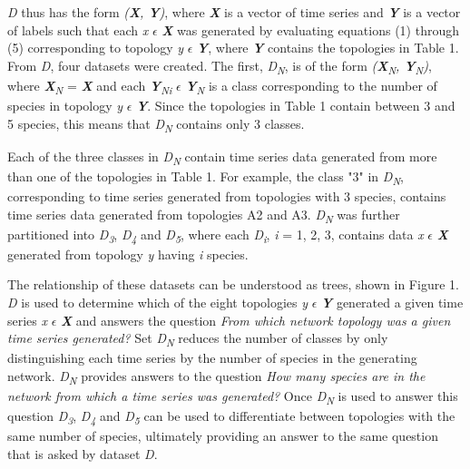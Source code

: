 \documentclass[letterpaper, 10 pt, conference]{ieeeconf}  %
\begin{document}
\textit{D} thus has the form \textit{(\textbf{X}, \textbf{Y})}, where \textit{\textbf{X}} is a vector of time series and \textit{\textbf{Y}} is a vector of labels such that each \textit{x} $\epsilon$ \textit{\textbf{X}} was generated by evaluating equations (1) through (5) corresponding to topology \textit{y} $\epsilon$ \textit{\textbf{Y}}, where \textit{\textbf{Y}} contains the topologies in Table 1. From \textit{D}, four datasets were created. The first, \textit{D\textsubscript{N}}, is of the form \textit{(\textbf{X}\textsubscript{N}, \textbf{Y}\textsubscript{N})}, where \textit{\textbf{X}\textsubscript{N}} = \textit{\textbf{X}} and each \textit{\textbf{Y}\textsubscript{Ni}} $\epsilon$ \textit{\textbf{Y}\textsubscript{N}} is a class corresponding to the number of species in topology \textit{y} $\epsilon$ \textit{\textbf{Y}}. Since the topologies in Table 1 contain between 3 and 5 species, this means that \textit{D\textsubscript{N}} contains only 3 classes. 

Each of the three classes in \textit{D\textsubscript{N}} contain time series data generated from more than one of the topologies in Table 1. For example, the class "3" in \textit{D\textsubscript{N}}, corresponding to time series generated from topologies with 3 species, contains time series data generated from topologies A2 and A3. \textit{D\textsubscript{N}} was further partitioned into \textit{D\textsubscript{3}}, \textit{D\textsubscript{4}} and \textit{D\textsubscript{5}}, where each \textit{D\textsubscript{i}}, \textit{i} = 1, 2, 3, contains data \textit{x} $\epsilon$ \textit{\textbf{X}} generated from topology \textit{y} having \textit{i} species. 

The relationship of these datasets can be understood as trees, shown in Figure 1. \textit{D} is used to determine which of the eight topologies \textit{y} $\epsilon$ \textit{\textbf{Y}} generated a given time series \textit{x} $\epsilon$ \textit{\textbf{X}} and answers the question \textit{From which network topology was a given time series generated?} Set \textit{D\textsubscript{N}} reduces the number of classes by only distinguishing each time series by the number of species in the generating network. \textit{D\textsubscript{N}} provides answers to the question \textit{How many species are in the network from which a time series was generated?} Once \textit{D\textsubscript{N}} is used to answer this question \textit{D\textsubscript{3}}, \textit{D\textsubscript{4}} and \textit{D\textsubscript{5}} can be used to differentiate between topologies with the same number of species, ultimately providing an answer to the same question that is asked by dataset \textit{D}.
\end{document}
